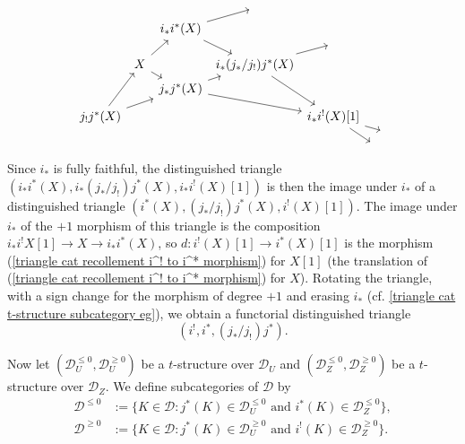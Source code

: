 \vspace*{-3mm}
\begin{equation}\label{triangle cat recollement octahedron}
\begin{tikzcd}[row sep=2pt,column sep=2pt]
&&&{}&\\
&&i_*i^*(X)\ar[ru]\ar[rdd]&&\\
&&&{}&{}\\
&X\ar[rd]\ar[ruu]&&i_*(j_*/j_!)j^*(X)\ar[ru]\ar[rddd]\\
&&j_*j^*(X)\ar[ru]\ar[rrdd]&&\\
&&&&\\
j_!j^*(X)\ar[ruuu]\ar[rruu]&&&&i_*i^!(X)[1]\ar[rdd]\ar[rrd]\\
&&&&&&{}\\
&&&&&{}&
\end{tikzcd}
\vspace*{-3mm}
\end{equation}
Since $i_*$ is fully faithful, the distinguished triangle $(i_*i^*(X),i_*(j_*/j_!)j^*(X),i_*i^!(X)[1])$ is then the image under $i_*$ of a distinguished triangle $(i^*(X),(j_*/j_!)j^*(X),i^!(X)[1])$. The image under $i_*$ of the $+1$ morphism of this triangle is the composition $i_*i^!X[1]\to X\to i_*i^*(X)$, so $d:i^!(X)[1]\to i^*(X)[1]$ is the morphism (\ref{triangle cat recollement i^! to i^* morphism}) for $X[1]$ (the translation of (\ref{triangle cat recollement i^! to i^* morphism}) for $X$). Rotating the triangle, with a sign change for the morphism of degree $+1$ and erasing $i_*$ (cf. \cref{triangle cat t-structure subcategory eg}), we obtain a functorial distinguished triangle
\begin{equation}\label{triangle cat recollement j_*/j_! dt-2}
(i^!,i^*,(j_*/j_!)j^*).
\end{equation}

Now let $(\mathcal{D}_U^{\leq 0},\mathcal{D}_U^{\geq 0})$ be a $t$-structure over $\mathcal{D}_U$ and $(\mathcal{D}_Z^{\leq 0},\mathcal{D}_Z^{\geq 0})$ be a $t$-structure over $\mathcal{D}_Z$. We define subcategories of $\mathcal{D}$ by
\begin{align*}
\mathcal{D}^{\leq 0}&:=\{K\in\mathcal{D}:\text{$j^*(K)\in\mathcal{D}_U^{\leq 0}$ and $i^*(K)\in\mathcal{D}_Z^{\leq 0}$}\},\\
\mathcal{D}^{\geq 0}&:=\{K\in\mathcal{D}:\text{$j^*(K)\in\mathcal{D}_U^{\geq 0}$ and $i^!(K)\in\mathcal{D}_Z^{\geq 0}$}\}.
\end{align*}

